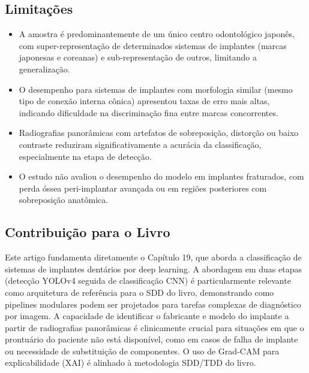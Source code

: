 \subsection{Limitações}
\begin{itemize}
  \item A amostra é predominantemente de um único centro odontológico
        japonês, com super-representação de determinados sistemas de
        implantes (marcas japonesas e coreanas) e sub-representação de
        outros, limitando a generalização.
  \item O desempenho para sistemas de implantes com morfologia similar
        (mesmo tipo de conexão interna cônica) apresentou taxas de erro
        mais altas, indicando dificuldade na discriminação fina entre
        marcas concorrentes.
  \item Radiografias panorâmicas com artefatos de sobreposição,
        distorção ou baixo contraste reduziram significativamente a
        acurácia da classificação, especialmente na etapa de detecção.
  \item O estudo não avaliou o desempenho do modelo em implantes
        fraturados, com perda óssea peri-implantar avançada ou em
        regiões posteriores com sobreposição anatômica.
\end{itemize}

\subsection{Contribuição para o Livro}
Este artigo fundamenta diretamente o Capítulo 19, que aborda a classificação
de sistemas de implantes dentários por deep learning. A abordagem em duas
etapas (detecção YOLOv4 seguida de classificação CNN) é particularmente
relevante como arquitetura de referência para o SDD do livro, demonstrando
como pipelines modulares podem ser projetados para tarefas complexas de
diagnóstico por imagem. A capacidade de identificar o fabricante e modelo
do implante a partir de radiografias panorâmicas é clinicamente crucial
para situações em que o prontuário do paciente não está disponível, como
em casos de falha de implante ou necessidade de substituição de
componentes. O uso de Grad-CAM para explicabilidade (XAI) é alinhado à
metodologia SDD/TDD do livro.

